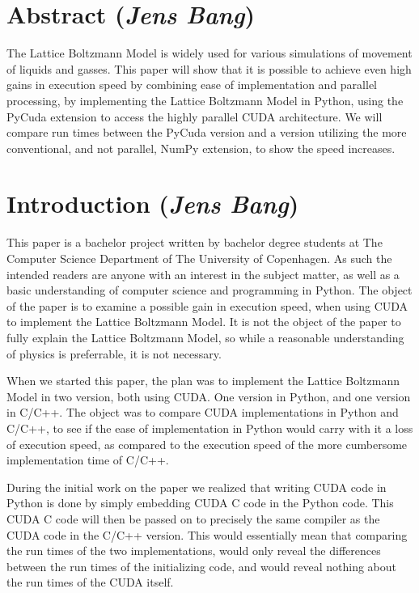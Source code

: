 
\section*{Abstract (\textit{Jens Bang})}

The Lattice Boltzmann Model is widely used for various simulations of movement of liquids and gasses. This paper will show that it is possible to achieve even high gains in execution speed by combining ease of implementation and parallel processing, by implementing the Lattice Boltzmann Model in Python, using the PyCuda extension to access the highly parallel CUDA architecture. We will compare run times between the PyCuda version and a version utilizing the more conventional, and not parallel, NumPy extension, to show the speed increases.

\newpage
\tableofcontents
\newpage

\section{Introduction (\textit{Jens Bang})}

This paper is a bachelor project written by bachelor degree students at The Computer Science Department of The University of Copenhagen. As such the intended readers are anyone with an interest in the subject matter, as well as a basic understanding of computer science and programming in Python. The object of the paper is to examine a possible gain in execution speed, when using CUDA to implement the Lattice Boltzmann Model. It is not the object of the paper to fully explain the Lattice Boltzmann Model, so while a reasonable understanding of physics is preferrable, it is not necessary.

When we started this paper, the plan was to implement the Lattice Boltzmann Model in two version, both using CUDA. One version in Python, and one version in C/C++. The object was to compare CUDA implementations in Python and C/C++, to see if the ease of implementation in Python would carry with it a loss of execution speed, as compared to the execution speed of the more cumbersome implementation time of C/C++.

During the initial work on the paper we realized that writing CUDA code in Python is done by simply embedding CUDA C code in the Python code. This CUDA C code will then be passed on to precisely the same compiler as the CUDA code in the C/C++ version. This would essentially mean that comparing the run times of the two implementations, would only reveal the differences between the run times of the initializing code, and would reveal nothing about the run times of the CUDA itself.

